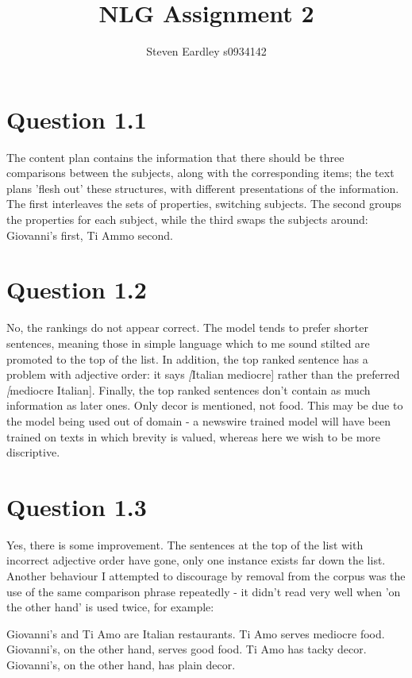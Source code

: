 \documentclass[a4paper,11pt,oneside]{article}
\begin{document}
\title{NLG Assignment 2}
\author{Steven Eardley s0934142}

\section{Question 1.1}
The content plan contains the information that there should be three comparisons between the subjects, along with the corresponding items; the text plans 'flesh out' these structures, with different presentations of the information. The first interleaves the sets of properties, switching subjects. The second groups the properties for each subject, while the third swaps the subjects around: Giovanni's first, Ti Ammo second.

\section{Question 1.2}
No, the rankings do not appear correct. The model tends to prefer shorter sentences, meaning those in simple language which to me sound stilted are promoted to the top of the list. In addition, the top ranked sentence has a problem with adjective order: it says \emph[Italian mediocre] rather than the preferred \emph[mediocre Italian]. Finally, the top ranked sentences don't contain as much information as later ones. Only decor is mentioned, not food. This may be due to the model being used out of domain - a newswire trained model will have been trained on texts in which brevity is valued, whereas here we wish to be more discriptive.

\section{Question 1.3}
Yes, there is some improvement. The sentences at the top of the list with incorrect adjective order have gone, only one instance exists far down the list. Another behaviour I attempted to discourage by removal from the corpus was the use of the same comparison phrase repeatedly - it didn't read very well when 'on the other hand' is used twice, for example:
    
    Giovanni's and Ti Amo are Italian restaurants. Ti Amo serves mediocre food. Giovanni's, on the other hand, serves good food. Ti Amo has tacky decor. Giovanni's, on the other hand, has plain decor.
\end{document}
